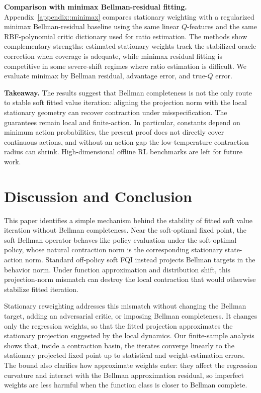 \documentclass{article}
\theoremstyle{plain}
\theoremstyle{definition}
\theoremstyle{remark}
\begin{document}
\textbf{Comparison with minimax Bellman-residual fitting.}
Appendix~\ref{appendix::minimax} compares stationary weighting with a
regularized minimax Bellman-residual baseline using the same linear
\(Q\)-features and the same RBF-polynomial critic dictionary used for ratio
estimation. The methods show complementary strengths: estimated stationary
weights track the stabilized oracle correction when coverage is adequate, while
minimax residual fitting is competitive in some severe-shift regimes where
ratio estimation is difficult. We evaluate minimax by Bellman residual,
advantage error, and true-\(Q\) error.

\textbf{Takeaway.}
The results suggest that Bellman completeness is not the only route to stable
soft fitted value iteration: aligning the projection norm with the local
stationary geometry can recover contraction under misspecification. The
guarantees remain local and finite-action. In particular, constants depend on
minimum action probabilities, the present proof does not directly cover
continuous actions, and without an action gap the low-temperature contraction
radius can shrink. High-dimensional offline RL benchmarks are left for future
work.


\FloatBarrier










 \appendix
\section{Discussion and Conclusion}
\label{app:additional-conclusion}

This paper identifies a simple mechanism behind the stability of fitted soft
value iteration without Bellman completeness. Near the soft-optimal fixed point,
the soft Bellman operator behaves like policy evaluation under the soft-optimal
policy, whose natural contraction norm is the corresponding stationary
state-action norm. Standard off-policy soft FQI instead projects Bellman targets
in the behavior norm. Under function approximation and distribution shift, this
projection-norm mismatch can destroy the local contraction that would otherwise
stabilize fitted iteration.

Stationary reweighting addresses this mismatch without changing the Bellman
target, adding an adversarial critic, or imposing Bellman completeness. It
changes only the regression weights, so that the fitted projection approximates
the stationary projection suggested by the local dynamics. Our finite-sample
analysis shows that, inside a contraction basin, the iterates converge linearly
to the stationary projected fixed point up to statistical and weight-estimation
errors. The bound also clarifies how approximate weights enter: they affect the
regression curvature and interact with the Bellman approximation residual, so
imperfect weights are less harmful when the function class is closer to Bellman
complete.
\end{document}
